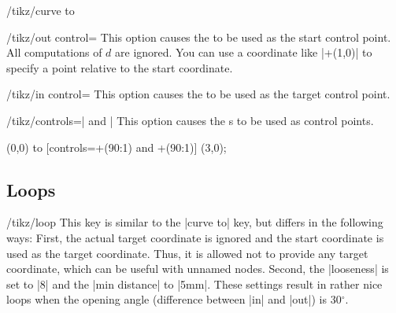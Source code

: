 \begin{key}{/tikz/curve to}
\begin{key}{/tikz/out control=}
    This option causes the  to be used as the start
    control point. All computations of $d$ are ignored. You can use a
    coordinate like |+(1,0)| to specify a point relative to the start
    coordinate.
  \end{key}
  \begin{key}{/tikz/in control=}
    This option causes the  to be used as the target
    control point.
  \end{key}
  \begin{key}{/tikz/controls=| and |}
    This option causes the s to be used as control
    points.
\begin{codeexample}[]
\tikz \draw (0,0) to [controls=+(90:1) and +(90:1)] (3,0);
\end{codeexample}
  \end{key}
\end{key}


\subsection{Loops}

\begin{key}{/tikz/loop}
  This key is similar to the |curve to| key, but differs in the
  following ways: First, the actual target coordinate is ignored and the
  start coordinate is used as the target coordinate. Thus, it is
  allowed not to provide any target coordinate, which can be useful
  with unnamed nodes. Second, the |looseness| is set to |8| and the
  |min distance| to |5mm|. These settings result in rather nice loops
  when the opening angle (difference between |in| and |out|) is
  30$^\circ$.
\begin{codeexample}[]
\end{codeexample}
\end{key}

